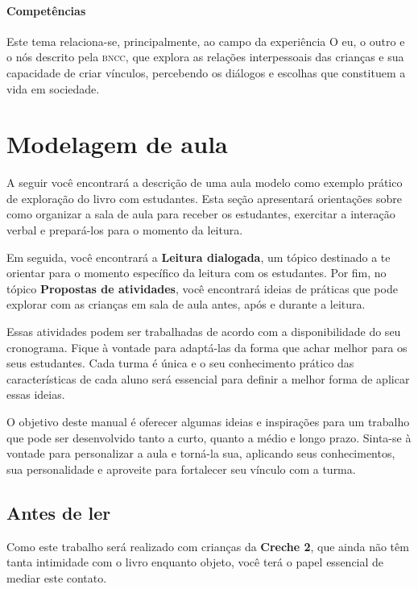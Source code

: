 \documentclass[11pt]{extarticle}
\begin{document}
\paragraph{Competências} Este tema relaciona-se, principalmente, ao 
campo da experiência O eu, o outro e o nós 
descrito pela \textsc{bncc}, que explora as relações interpessoais das crianças e sua capacidade de criar vínculos, percebendo os diálogos e escolhas que constituem a vida em sociedade.


\section{Modelagem de aula}
A seguir você encontrará a descrição de uma aula modelo como exemplo 
prático de exploração do livro com estudantes. Esta seção apresentará 
orientações sobre como organizar a sala de aula para receber os 
estudantes, exercitar a interação verbal e prepará-los para o 
momento da leitura.

Em seguida, você encontrará a \textbf{Leitura dialogada}, um 
tópico destinado a te orientar para o momento específico da 
leitura com os estudantes. Por fim, no tópico 
\textbf{Propostas de atividades}, você encontrará ideias 
de práticas que pode explorar com as crianças em sala de 
aula antes, após e durante a leitura. 

Essas atividades podem ser trabalhadas de acordo com a 
disponibilidade do seu cronograma. Fique à vontade para adaptá-las 
da forma que achar melhor para os seus estudantes. Cada turma é única 
e o seu conhecimento prático das características de cada aluno será 
essencial para definir a melhor forma de aplicar essas ideias. 

O objetivo deste manual é oferecer algumas ideias 
e inspirações para um trabalho que pode ser desenvolvido tanto 
a curto, quanto a médio e longo prazo. Sinta-se à vontade para 
personalizar a aula e torná-la sua, aplicando seus conhecimentos, sua 
personalidade e aproveite para fortalecer 
seu vínculo com a turma.


\subsection{Antes de ler}


Como este trabalho será realizado com crianças da \textbf{Creche 2}, 
que ainda não têm tanta intimidade com o livro enquanto objeto, você terá o 
papel essencial de mediar este contato. 
\end{document}
